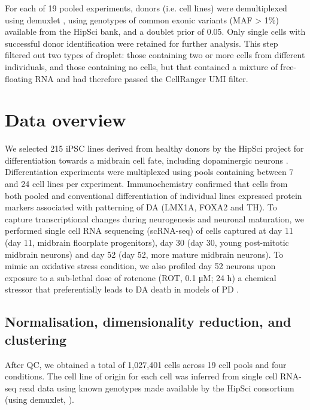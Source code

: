For each of 19 pooled experiments, donors (i.e. cell lines) were demultiplexed using demuxlet \cite{kang2018multiplexed}, using genotypes of common exonic variants (MAF > 1\%) available from the HipSci bank, and a doublet prior of 0.05. 
Only single cells with successful donor identification were retained for further analysis. 
This step filtered out two types of droplet: those containing two or more cells from different individuals, and those containing no cells, but that contained a mixture of free-floating RNA and had therefore passed the CellRanger UMI filter.

\section{Data overview}

We selected 215 iPSC lines derived from healthy donors by the HipSci project \cite{kilpinen2017common} for differentiation towards a midbrain cell fate, including dopaminergic neurons \cite{kriks2011dopamine}. 
Differentiation experiments were multiplexed using pools containing between 7 and 24 cell lines per experiment. 
Immunochemistry confirmed that cells from both pooled and conventional differentiation of individual lines expressed protein markers associated with patterning of DA (LMX1A, FOXA2 and TH). 
To capture transcriptional changes during neurogenesis and neuronal maturation, we performed single cell RNA sequencing (scRNA-seq) of cells captured at day 11 (day 11, midbrain floorplate progenitors), day 30 (day 30, young post-mitotic midbrain neurons) and day 52 (day 52, more mature midbrain neurons). 
To mimic an oxidative stress condition, we also profiled day 52 neurons upon exposure to a sub-lethal dose of rotenone (ROT, 0.1 μM; 24 h) a chemical stressor that preferentially leads to DA death in models of PD \cite{xiong2012mitochondrial}.

\subsection{Normalisation, dimensionality reduction, and clustering}

After QC, we obtained a total of 1,027,401 cells across 19 cell pools \cite{blondel2008fast} and four conditions. 
The cell line of origin for each cell was inferred from single cell RNA-seq read data using known genotypes made available by the HipSci consortium (using demuxlet, \cite{kang2018multiplexed}). 

